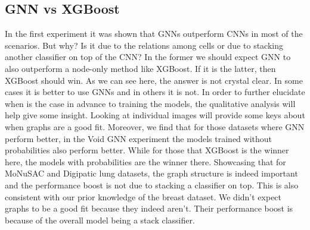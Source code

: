 \newpage
\subsection{GNN vs XGBoost}

In the first experiment it was shown that GNNs outperform CNNs in most of the scenarios. But why? Is it due to the relations among cells or due to stacking another classifier on top of the CNN? In the former we should expect GNN to also outperform a node-only method like XGBoost. If it is the latter, then XGBoost should win. As we can see here, the answer is not crystal clear. In some cases it is better to use GNNs and in others it is not. In order to further elucidate when is the case in advance to training the models, the qualitative analysis will help give some insight. Looking at individual images will provide some keys about when graphs are a good fit. Moreover, we find that for those datasets where GNN perform better, in the Void GNN experiment the models trained without probabilities also perform better. While for those that XGBoost is the winner here, the models with probabilities are the winner there. Showcasing that for MoNuSAC and Digipatic lung datasets, the graph structure is indeed important and the performance boost is not due to stacking a classifier on top. This is also consistent with our prior knowledge of the breast dataset. We didn't expect graphs to be a good fit because they indeed aren't. Their performance boost is because of the overall model being a stack classifier.

